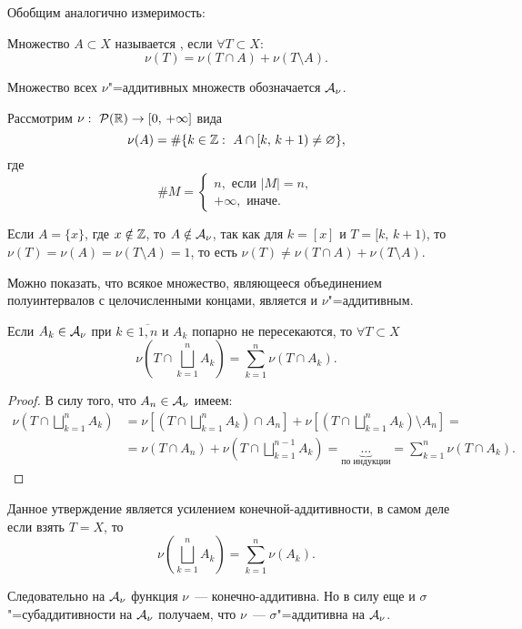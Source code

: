 Обобщим аналогично измеримость:

\begin{definition}
    Множество $A\subset X$ называется , если $\forall T\subset X$:
    \[
        \nu(T)=\nu(T\cap A)+\nu(T\setminus A).
    \]

    Множество всех $\nu$"=аддитивных множеств обозначается $\mathcal{A}_{\nu}$.
\end{definition}

\begin{exercise}
    Рассмотрим $\nu:\ \mathcal{P}(\mathbb{R})\rightarrow [0,\,+\infty]$ вида \[\nu(A)=\#\{k\in\Z:\ A\cap[k,\,k+1)\neq\varnothing\},\]
    где \[
        \# M = \begin{cases}
            n,\text{ если } |M|=n, \\
            +\infty, \text{ иначе.}
        \end{cases}
    \]

    Если $A=\{x\}$, где $x\notin\mathbb{Z}$, то $A\notin \mathcal{A}_{\nu}$, так как для $k=[x]$ и $T=[k,\,k+1)$, то $\nu(T)=\nu(A)=\nu(T\setminus A)=1$, то есть
    $\nu(T)\neq\nu(T\cap A)+\nu(T\setminus A)$.

    Можно показать, что всякое множество, являющееся объединением полуинтервалов с целочисленными концами, является и $\nu$"=аддитивным.
\end{exercise}

\begin{claim}
    \label{lect06:claim}
    Если $A_k\in\mathcal{A}_{\nu}$ при $k\in \overline{1,n}$ и $A_k$ попарно не пересекаются, то $\forall T\subset X$
    \[
        \nu\left(T\cap\bigsqcup_{k=1}^{n}A_k\right)=\sum_{k=1}^{n}\nu(T\cap A_k).
    \]

    \begin{proof}

        В силу того, что $A_n\in\mathcal{A}_{\nu}$ имеем:
        \begin{align*}
            \nu\left(T\cap\bigsqcup_{k=1}^{n}A_k\right) & =\nu\left[\left(T\cap\bigsqcup_{k=1}^{n}A_k\right)\cap A_n\right]+
            \nu\left[\left(T\cap\bigsqcup_{k=1}^{n}A_k\right)\setminus A_n\right]=                                                                                 \\
                                                        & =\nu(T\cap A_n)+\nu\left(T\cap \bigsqcup_{k=1}^{n-1}A_k\right)=\underbrace{\ldots}_{\text{по индукции}}=
            \sum_{k=1}^{n}\nu(T\cap A_k).
        \end{align*}

    \end{proof}

    \begin{remark}
        Данное утверждение является усилением конечной-аддитивности, в самом деле если взять $T=X$, то
        \[
            \nu\left(\bigsqcup_{k=1}^{n}A_k\right)=\sum_{k=1}^n\nu(A_k).
        \]

        Следовательно на $\mathcal{A}_{\nu}$ функция $\nu$~--- конечно-аддитивна.
        Но в силу еще и $\sigma$"=субаддитивности на $\mathcal{A}_{\nu}$ получаем, что $\nu$~--- $\sigma$"=аддитивна на $\mathcal{A}_{\nu}$.
    \end{remark}
\end{claim}

